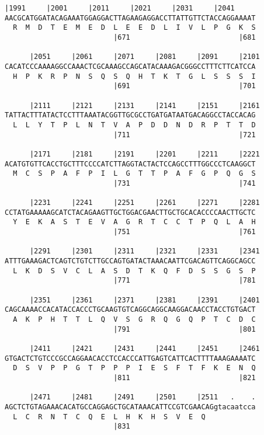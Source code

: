 \documentclass{article}
\begin{document}
\begin{Verbatim}[fontfamily=courier]
      |1991     |2001     |2011     |2021     |2031     |2041
AACGCATGGATACAGAAATGGAGGACTTAGAAGAGGACCTTATTGTTCTACCAGGAAAAT
  R  M  D  T  E  M  E  D  L  E  E  D  L  I  V  L  P  G  K  S
                          |671                          |681

      |2051     |2061     |2071     |2081     |2091     |2101
CACATCCCAAAAGGCCAAACTCGCAAAGCCAGCATACAAAGACGGGCCTTTCTTCATCCA
  H  P  K  R  P  N  S  Q  S  Q  H  T  K  T  G  L  S  S  S  I
                          |691                          |701

      |2111     |2121     |2131     |2141     |2151     |2161
TATTACTTTATACTCCTTTAAATACGGTTGCGCCTGATGATAATGACAGGCCTACCACAG
  L  L  Y  T  P  L  N  T  V  A  P  D  D  N  D  R  P  T  T  D
                          |711                          |721

      |2171     |2181     |2191     |2201     |2211     |2221
ACATGTGTTCACCTGCTTTCCCCATCTTAGGTACTACTCCAGCCTTTGGCCCTCAAGGCT
  M  C  S  P  A  F  P  I  L  G  T  T  P  A  F  G  P  Q  G  S
                          |731                          |741

      |2231     |2241     |2251     |2261     |2271     |2281
CCTATGAAAAAGCATCTACAGAAGTTGCTGGACGAACTTGCTGCACACCCCAACTTGCTC
  Y  E  K  A  S  T  E  V  A  G  R  T  C  C  T  P  Q  L  A  H
                          |751                          |761

      |2291     |2301     |2311     |2321     |2331     |2341
ATTTGAAAGACTCAGTCTGTCTTGCCAGTGATACTAAACAATTCGACAGTTCAGGCAGCC
  L  K  D  S  V  C  L  A  S  D  T  K  Q  F  D  S  S  G  S  P
                          |771                          |781

      |2351     |2361     |2371     |2381     |2391     |2401
CAGCAAAACCACATACCACCCTGCAAGTGTCAGGCAGGCAAGGACAACCTACCTGTGACT
  A  K  P  H  T  T  L  Q  V  S  G  R  Q  G  Q  P  T  C  D  C
                          |791                          |801

      |2411     |2421     |2431     |2441     |2451     |2461
GTGACTCTGTCCCGCCAGGAACACCTCCACCCATTGAGTCATTCACTTTTAAAGAAAATC
  D  S  V  P  P  G  T  P  P  P  I  E  S  F  T  F  K  E  N  Q
                          |811                          |821

      |2471     |2481     |2491     |2501     |2511   .    .
AGCTCTGTAGAAACACATGCCAGGAGCTGCATAAACATTCCGTCGAACAGgtacaatcca
  L  C  R  N  T  C  Q  E  L  H  K  H  S  V  E  Q            
                          |831                              

\end{Verbatim}
\end{document}
